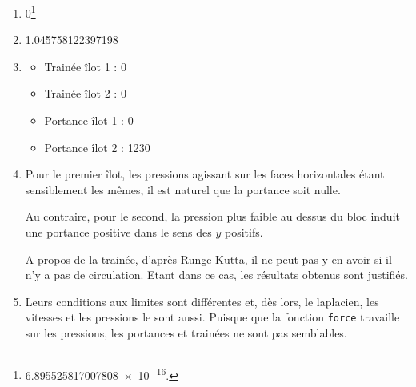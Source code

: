 \documentclass[a4paper, 12pt]{article}
\begin{document}
\begin{enumerate}[label=Q\arabic*.]
		\item  \unit{\num{0}}{\squaren\meter\per\second}\footnote{\unit{\num{6.895525817007808e-16}}{\squaren\meter\per\second}.}
		\item \unit{\num{1.045758122397198}}{\squaren\meter\per\second}
		\item
		\begin{itemize}
			\item Trainée îlot 1 : \unit{\num{0}}{\newton\per\meter}
			\item Trainée îlot 2 : \unit{\num{0}}{\newton\per\meter}
			\item Portance îlot 1 : \unit{\num{0}}{\newton\per\meter}
			\item Portance îlot 2 : \unit{\num{1230}}{\newton\per\meter}
		\end{itemize}
		\item Pour le premier îlot, les pressions agissant sur les faces horizontales étant sensiblement les mêmes, il est naturel que la portance soit nulle. \par 
		Au contraire, pour le second, la pression plus faible au dessus du bloc induit une portance positive dans le sens des $y$ positifs. \par
		A propos de la trainée, d'après Runge-Kutta, il ne peut pas y en avoir si il n'y a pas de circulation. Etant dans ce cas, les résultats obtenus sont justifiés.
		\item Leurs conditions aux limites sont différentes et, dès lors, le laplacien, les vitesses et les pressions le sont aussi. Puisque que la fonction \texttt{force} travaille sur les pressions, les portances et trainées ne sont pas semblables.
	\end{enumerate}	
\end{document}
